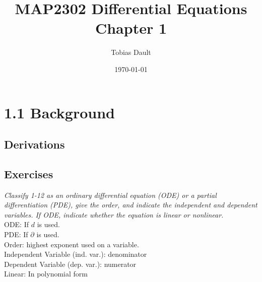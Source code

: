 \documentclass[12pt]{report}
\title{\textbf{MAP2302 Differential Equations \\ Chapter 1}}
\author{Tobias Dault}
\date{\today}
\begin{document}
	\maketitle
	\tableofcontents
	\thispagestyle{empty}
	\chapter*{1.1 Background}
		\section*{Derivations}
		\section*{Exercises}
			\emph{Classify 1-12 as an ordinary differential equation (ODE) or a partial differentiation (PDE), give the order, and indicate the independent and dependent variables. If ODE, indicate whether the equation is linear or nonlinear.}\\
			ODE: If $d$ is used.\\
			PDE: If $\partial$ is used.\\
			Order: highest exponent used on a variable.\\
			Independent Variable (ind. var.): denominator\\
			Dependent Variable (dep. var.): numerator\\
			Linear: In polynomial form\\
\end{document}
